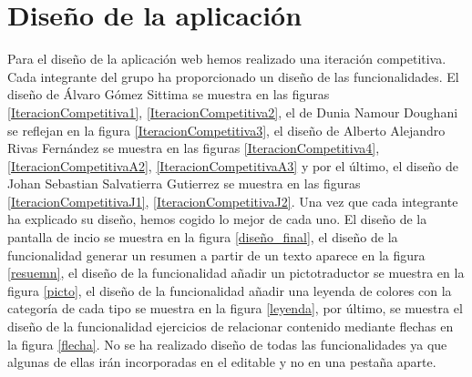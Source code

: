 \section{Diseño de la aplicación}
\label{disenyoDeLaAplicacion}
Para el diseño de la aplicación web hemos realizado una iteración competitiva. Cada integrante del grupo ha proporcionado un diseño de las funcionalidades. El diseño de Álvaro Gómez Sittima se muestra en las figuras \ref{IteracionCompetitiva1}, \ref{IteracionCompetitiva2}, el de Dunia Namour Doughani se reflejan en la figura \ref{IteracionCompetitiva3}, el diseño de Alberto Alejandro Rivas Fernández se muestra en las figuras \ref{IteracionCompetitiva4}, \ref{IteracionCompetitivaA2}, \ref{IteracionCompetitivaA3} y por el último, el diseño de Johan Sebastian Salvatierra Gutierrez se muestra en las figuras \ref{IteracionCompetitivaJ1}, \ref{IteracionCompetitivaJ2}. Una vez que cada integrante ha explicado su diseño, hemos cogido lo mejor de cada uno. El diseño de la pantalla de incio se muestra en la figura \ref{diseño_final}, el diseño de la funcionalidad generar un resumen a partir de un texto aparece en la figura \ref{resuemn}, el diseño de la funcionalidad añadir un pictotraductor se muestra en la figura \ref{picto}, el diseño de la funcionalidad añadir una leyenda de colores con la categoría de cada tipo se muestra en la figura \ref{leyenda}, por último, se muestra el diseño de la funcionalidad ejercicios de relacionar contenido mediante flechas en la figura \ref{flecha}. No se ha realizado diseño de todas las funcionalidades ya que algunas de ellas irán incorporadas en el editable y no en una pestaña aparte.


